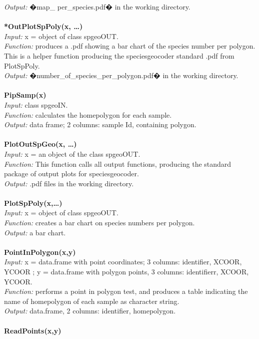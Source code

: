 \documentclass[a4paper,titlepage,11pt]{scrreprt}
\begin{document}
\textit{Output:} �map\_ per\_species.pdf� in the working directory.\\
\\
\textbf{*OutPlotSpPoly(x, \dots)}\\
\textit{Input:} x = object of class spgeoOUT.\\
\textit{Function:} produces a .pdf showing a bar chart of the species number per polygon. This is a helper function producing the speciesgeocoder standard .pdf from PlotSpPoly.\\
\textit{Output:} �number\_of\_species\_per\_polygon.pdf� in the working directory.\\
\\
\textbf{PipSamp(x)}\\
\textit{Input:} class spgeoIN.\\
\textit{Function:} calculates the homepolygon for each sample.\\
\textit{Output:} data frame; 2 columns: sample Id, containing polygon.\\
\\
\textbf{PlotOutSpGeo(x, \dots)}\\
\textit{Input:} x = an object of the class spgeoOUT.\\
\textit{Function:} This function calls all output functions, producing the standard package of output plots for speciesgeocoder.\\
\textit{Output:} .pdf files in the working directory.\\
\\
\textbf{PlotSpPoly(x,\dots)}\\
\textit{Input:} x = object of class spgeoOUT.\\
\textit{Function:} creates a bar chart on species numbers per polygon.\\
\textit{Output:} a bar chart.\\
\\
\textbf{PointInPolygon(x,y)}\\
\textit{Input:} x = data.frame with point coordinates; 3 columns: identifier, XCOOR, YCOOR ; y = data.frame with polygon points, 3 columns: identifierr, XCOOR, YCOOR. \\ 
\textit{Function:} performs a point in polygon test, and produces a table indicating the name of homepolygon of each sample as character string.\\
\textit{Output:} data.frame, 2 columns: identifier, homepolygon.\\
\\
\textbf{ReadPoints(x,y)}\\
\end{document}
